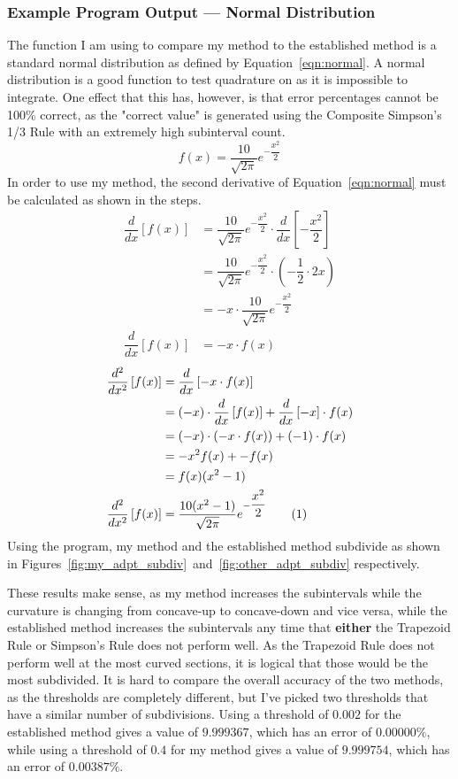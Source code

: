 \documentclass{paper}
\newcommand{\listsnippets}{List of Code Snippets}
\newcommand{\listofsnippets}{
    \begingroup
        \tocfile{\listsnippets}{snip}
    \endgroup
}
\newcommand*\tageq{\refstepcounter{equation}\tag{\theequation}}
\newcommand{\der}[1]{\dfrac{d}{dx}\left[#1\right]}
\newcommand{\sder}[1]{\dfrac{d^2}{dx^2}\left[#1\right]}
\begin{document}
\subsubsection{Example Program Output --- Normal Distribution}
The function I am using to compare my method to the established method is a standard normal distribution as defined by Equation~\ref{eqn:normal}.
A normal distribution is a good function to test quadrature on as it is impossible to integrate.
One effect that this has, however, is that error percentages cannot be 100\% correct, as the "correct value" is  generated using the Composite Simpson's 1/3 Rule with an extremely high subinterval count.
% 
\begin{equation}
    \label{eqn:normal}
    f(x) = \dfrac{10}{\sqrt{2\pi}}e^{-\dfrac{x^2}{2}}
\end{equation}
% 
In order to use my method, the second derivative of Equation~\ref{eqn:normal} must be calculated as shown in the steps.
% 
\begin{align*}
    \der{f(x)} &= \dfrac{10}{\sqrt{2\pi}}e^{-\dfrac{x^2}{2}} \cdot \der{-\dfrac{x^2}{2}}\\
    &= \dfrac{10}{\sqrt{2\pi}}e^{-\dfrac{x^2}{2}} \cdot \left(-\dfrac{1}{2} \cdot 2x\right)\\
    &= -x \cdot \dfrac{10}{\sqrt{2\pi}}e^{-\dfrac{x^2}{2}}\\
    \der{f(x)} &= -x \cdot f(x)
\end{align*}
\begin{align*}
    \sder{f(x)} &= \der{-x \cdot f(x)}\\
    &= (-x) \cdot \der{f(x)} + \der{-x} \cdot f(x)\\
    &= (-x) \cdot (-x \cdot f(x)) + (-1) \cdot f(x)\\
    &= -x^2f(x) + -f(x)\\
    &= f(x)(x^2-1)\\
    \sder{f(x)} &= \dfrac{10(x^2 - 1)}{\sqrt{2\pi}}e^{-\dfrac{x^2}{2}} \tageq\label{eqn:2nd_derivative_normal}
\end{align*}
%
Using the program, my method and the established method subdivide as shown in Figures~\ref{fig:my_adpt_subdiv}~and~\ref{fig:other_adpt_subdiv} respectively.
%


%
These results make sense, as my method increases the subintervals while the curvature is changing from concave-up to concave-down and vice versa, while the established method increases the subintervals any time that \textbf{either} the Trapezoid Rule or Simpson's Rule does not perform well.
As the Trapezoid Rule does not perform well at the most curved sections, it is logical that those would be the most subdivided.
It is hard to compare the overall accuracy of the two methods, as the thresholds are completely different, but I've picked two thresholds that have a similar number of subdivisions.
Using a threshold of \(0.002\) for the established method gives a value of \(9.999367\), which has an error of \(0.00000\%\), while using a threshold of \(0.4\) for my method gives a value of \(9.999754\), which has an error of \(0.00387\%\).

\newpage
\listoffigures
\vspace{1cm}
\listofsnippets
\end{document}
